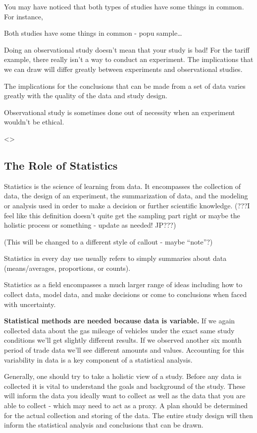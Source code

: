 \documentclass[
]{book}
\theoremstyle{definition}
\theoremstyle{definition}
\theoremstyle{definition}
\theoremstyle{remark}
\let\BeginKnitrBlock\begin \let\EndKnitrBlock\end
\begin{document}
You may have noticed that both types of studies have some things in common. For instance,

Both studies have some things in common - popu sample\ldots{}

Doing an observational study doesn't mean that your study is bad! For the tariff example, there really isn't a way to conduct an experiment. The implications that we can draw will differ greatly between experiments and observational studies.

The implications for the conclusions that can be made from a set of data varies greatly with the quality of the data and study design.

Observational study is sometimes done out of necessity when an experiment wouldn't be ethical.

\textless{}\textgreater{}

\hypertarget{the-role-of-statistics}{%
\subsection{The Role of Statistics}\label{the-role-of-statistics}}

Statistics is the science of learning from data. It encompasses the collection of data, the design of an experiment, the summarization of data, and the modeling or analysis used in order to make a decision or further scientific knowledge. (???I feel like this definition doesn't quite get the sampling part right or maybe the holistic process or something - update as needed! JP???)

\BeginKnitrBlock{definition}
(This will be changed to a different style of callout - maybe ``note''?)

Statistics in every day use usually refers to simply summaries about data (means/averages, proportions, or counts).

Statistics as a field encompasses a much larger range of ideas including how to collect data, model data, and make decisions or come to conclusions when faced with uncertainty.
\EndKnitrBlock{definition}

\textbf{Statistical methods are needed because data is variable.} If we again collected data about the gas mileage of vehicles under the exact same study conditions we'll get slightly different results. If we observed another six month period of trade data we'll see different amounts and values. Accounting for this variability in data is a key component of a statistical analysis.

Generally, one should try to take a holistic view of a study. Before any data is collected it is vital to understand the goals and background of the study. These will inform the data you ideally want to collect as well as the data that you are able to collect - which may need to act as a proxy. A plan should be determined for the actual collection and storing of the data. The entire study design will then inform the statistical analysis and conclusions that can be drawn.
\end{document}
